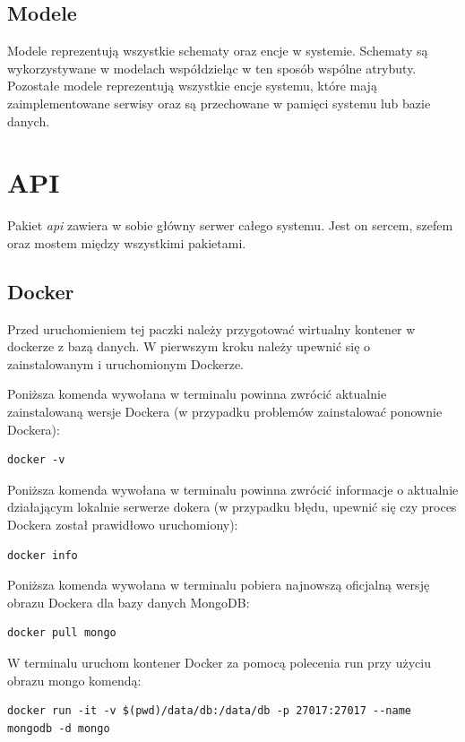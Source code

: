 \subsection{Modele}
Modele reprezentują wszystkie schematy oraz encje w systemie.
Schematy są wykorzystywane w modelach współdzieląc w ten sposób wspólne atrybuty. Pozostałe modele reprezentują wszystkie encje systemu, które mają zaimplementowane serwisy oraz są przechowane w pamięci systemu lub bazie danych.

\section{API}
Pakiet \textit{api} zawiera w sobie główny serwer całego systemu. Jest on sercem, szefem oraz mostem między wszystkimi pakietami.

\subsection{Docker}
Przed uruchomieniem tej paczki należy przygotować wirtualny kontener w dockerze z bazą danych. W pierwszym kroku należy upewnić się o zainstalowanym i uruchomionym Dockerze.

Poniższa komenda wywołana w terminalu powinna zwrócić aktualnie zainstalowaną wersje Dockera (w przypadku problemów zainstalować ponownie Dockera):
\begin{lstlisting}[caption={Sprawdzenie zainstalowanej wersji Dockera}]
docker -v
\end{lstlisting}

Poniższa komenda wywołana w terminalu powinna zwrócić informacje o aktualnie działającym lokalnie serwerze dokera (w przypadku błędu, upewnić się czy proces Dockera został prawidłowo uruchomiony):
\begin{lstlisting}[caption={Wyświetlenie informacji o działającym dockerze}]
docker info
\end{lstlisting}

Poniższa komenda wywołana w terminalu pobiera najnowszą oficjalną wersję obrazu Dockera dla bazy danych MongoDB:

\begin{lstlisting}[caption={Pobranie obrazu dockera dla MongoDB}]
docker pull mongo
\end{lstlisting}

W terminalu uruchom kontener Docker za pomocą polecenia run przy użyciu obrazu mongo komendą:

\begin{lstlisting}[caption={Uruchomienie kontenera z bazą danych}]
docker run -it -v $(pwd)/data/db:/data/db -p 27017:27017 --name mongodb -d mongo
\end{lstlisting}

